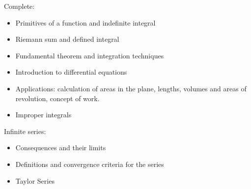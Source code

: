 Complete:
\begin{itemize}
    \item Primitives of a function and indefinite integral
    \item Riemann sum and defined integral
    \item Fundamental theorem and integration techniques
    \item Introduction to differential equations
    \item Applications: calculation of areas in the plane, lengths, volumes and areas of revolution, concept of work.
    \item Improper integrals
\end{itemize}
Infinite series:
\begin{itemize}
    \item Consequences and their limits
    \item Definitions and convergence criteria for the series
    \item Taylor Series
\end{itemize}